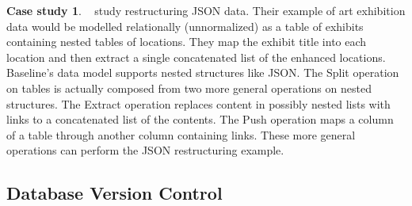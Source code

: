 \documentclass[english,submission]{programming}
\theoremstyle{definition}
\newtheorem*{remark}{Remark}
\newtheorem{casestudy}{Case study}
\newcommand{\citet}[1]{\citeauthor*{#1}~\cite{#1}}
\begin{document}
\begin{casestudy}
\citet{sculpin} study restructuring JSON data. Their example of art exhibition data would be modelled relationally (unnormalized) as a table of exhibits containing nested tables of locations. They map the exhibit title into each location and then extract a single concatenated list of the enhanced locations. Baseline's data model supports nested structures like JSON. The \textsf{Split} operation on tables is actually composed from two more general operations on nested structures. The \textsf{Extract} operation replaces content in possibly nested lists with links to a concatenated list of the contents. The \textsf{Push} operation maps a column of a table through another column containing links. These more general operations can perform the JSON restructuring example.
\end{casestudy}




\subsection{Database Version Control}\label{db-vc}
\end{document}
